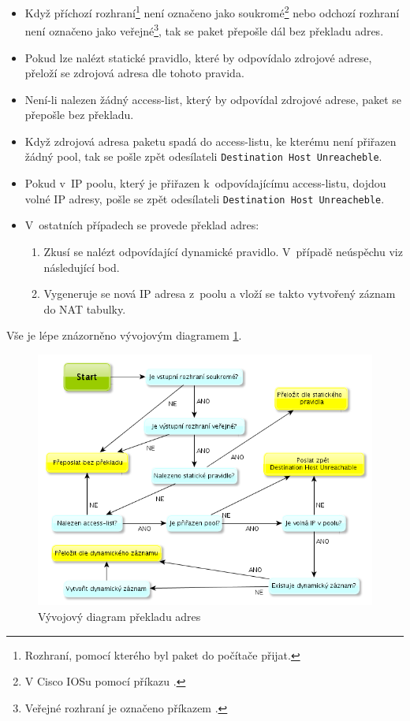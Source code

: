 \begin{itemize}
\item Když příchozí rozhraní\footnote{Rozhraní, pomocí kterého byl paket do počítače přijat.} není označeno jako soukromé\footnote{V Cisco IOSu pomocí příkazu .} nebo odchozí rozhraní není označeno jako veřejné\footnote{Veřejné rozhraní je označeno příkazem .}, tak se paket přepošle dál bez překladu adres.

\item Pokud lze nalézt statické pravidlo, které by odpovídalo zdrojové adrese,  přeloží se zdrojová adresa dle tohoto pravida.

\item Není-li nalezen žádný access-list, který by odpovídal zdrojové adrese, paket se přepošle bez překladu.

\item Když zdrojová adresa paketu spadá do access-listu, ke kterému není přiřazen žádný pool, tak se pošle zpět odesílateli \verb|Destination Host Unreacheble|.

\item Pokud v~IP poolu, který je přiřazen k~odpovídajícímu access-listu, dojdou volné IP adresy, pošle se zpět odesílateli \verb|Destination Host Unreacheble|.

\item V~ostatních případech se provede překlad adres:
    \begin{enumerate}
    \item Zkusí se nalézt odpovídající dynamické pravidlo. V~případě neúspěchu viz následující bod.
    \item Vygeneruje se nová IP adresa z~poolu a vloží se takto vytvořený záznam do NAT tabulky.
    \end{enumerate}
\end{itemize}

Vše je lépe znázorněno vývojovým diagramem \ref{fig:nat_decision}.

\begin{figure}[b]
\begin{center}
\includegraphics[width=16cm]{figures/nat_decision}
\caption{Vývojový diagram překladu adres}
\label{fig:nat_decision}
\end{center}
\end{figure}

